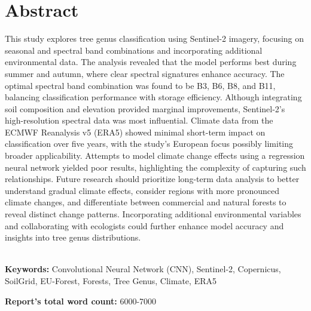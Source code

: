 \chapter*{\center \Large  Abstract}
This study explores tree genus classification using Sentinel-2 imagery, focusing on seasonal and spectral band combinations and incorporating additional environmental data. The analysis revealed that the model performs best during summer and autumn, where clear spectral signatures enhance accuracy. The optimal spectral band combination was found to be B3, B6, B8, and B11, balancing classification performance with storage efficiency. Although integrating soil composition and elevation provided marginal improvements, Sentinel-2’s high-resolution spectral data was most influential. Climate data from the ECMWF Reanalysis v5 (ERA5) showed minimal short-term impact on classification over five years, with the study’s European focus possibly limiting broader applicability. Attempts to model climate change effects using a regression neural network yielded poor results, highlighting the complexity of capturing such relationships. Future research should prioritize long-term data analysis to better understand gradual climate effects, consider regions with more pronounced climate changes, and differentiate between commercial and natural forests to reveal distinct change patterns. Incorporating additional environmental variables and collaborating with ecologists could further enhance model accuracy and insights into tree genus distributions.

~\\[1cm]
\noindent %
\textbf{Keywords:} Convolutional Neural Network (CNN), Sentinel-2, Copernicus, SoilGrid, EU-Forest, Forests, Tree Genus, Climate, ERA5

\vfill
\noindent
\textbf{Report's total word count:} 6000-7000